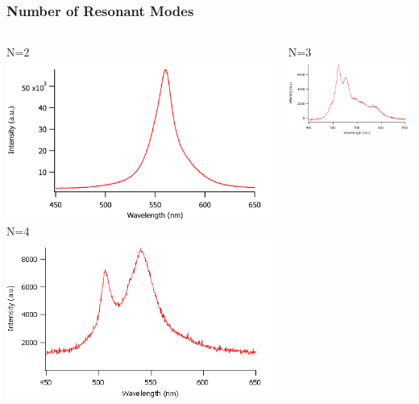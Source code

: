 \documentclass{beamer}
\begin{document}
        \begin{frame}
            \frametitle{Number of Resonant Modes}
            \begin{columns}
				\begin{column}{0.5\textwidth}
					\centering
					N=2\\
					\includegraphics[width=\textwidth]{images/n2_fe.png}\\
					N=4\\
					\includegraphics[width=\textwidth]{images/n4_fe.png}
				\end{column}
				\begin{column}{0.5\textwidth}
					\centering
					N=3\\
					\includegraphics[width=\textwidth]{images/n3_fe.png}\\

\end{column}
\end{columns}
\end{frame}
\end{document}
